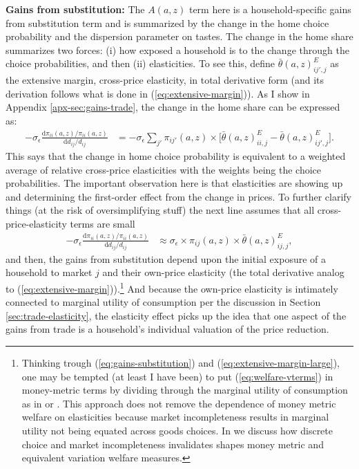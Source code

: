 \documentclass[12pt,pdftex]{article}
\begin{document}
\begin{onehalfspacing}
\textbf{Gains from substitution:} The $A(a,z)$ term here is a household-specific gains from substitution term and is summarized by the change in the home choice probability and the dispersion parameter on tastes. The change in the home share summarizes two forces: (i) how exposed a household is to the change through the choice probabilities, and then (ii) elasticities. To see this, define $\bar{\theta}(a,z) ^E_{ij',j}$ as the extensive margin, cross-price elasticity, in total derivative form (and its derivation follows what is done in (\ref{eq:extensive-margin})). As I show in Appendix \ref{apx-sec:gains-trade}, the change in the home share can be expressed as:
\begin{align}
-\sigma_{\epsilon} \frac{\mathrm{d} \pi_{ii}(a,z) / \pi_{ii}(a,z) }{\mathrm{d} d_{ij} / d_{ij}} &= -\sigma_{\epsilon} \sum_{j'} \pi_{ij'}(a,z) \times \bigg[ \bar{\theta}(a,z) ^E_{ii,j} - \bar{\theta}(a,z) ^E_{ij',j}\bigg]. \label{eq:gains-substitution-cross-price}
\end{align}
This says that the change in home choice probability is equivalent to a weighted average of relative cross-price elasticities with the weights being the choice probabilities. The important observation here is that elasticities are showing up and determining the first-order effect from the change in prices. To further clarify things (at the risk of oversimplifying stuff) the next line assumes that all cross-price-elasticity terms are small
\begin{align}
-\sigma_{\epsilon} \frac{\mathrm{d} \pi_{ii}(a,z) / \pi_{ii}(a,z) }{\mathrm{d} d_{ij} / d_{ij}} & \approx
\sigma_{\epsilon} \times \pi_{ij}(a,z) \times \bar{\theta}(a,z) ^E_{ij,j},
\label{eq:gains-substitution}
\end{align}
and then, the gains from substitution depend upon the initial exposure of a household to market $j$ and their own-price elasticity (the total derivative analog to (\ref{eq:extensive-margin})).\footnote{Thinking trough (\ref{eq:gains-substitution}) and (\ref{eq:extensive-margin-large}), one may be tempted (at least I have been) to put (\ref{eq:welfare-vterms}) in money-metric terms by dividing through the marginal utility of consumption as in \citet{walsh2023inflationary} or \citet{moll2022asset}. This approach does not remove the dependence of money metric welfare on elasticities because market incompleteness results in marginal utility not being equated across goods choices. In \citet{mongey-waugh-2} we discuss how discrete choice and market incompleteness invalidates shapes money metric and equivalent variation welfare measures.} And because the own-price elasticity is intimately connected to marginal utility of consumption per the discussion in Section \ref{sec:trade-elasticity}, the elasticity effect picks up the idea that one aspect of the gains from trade is a household's individual valuation of the price reduction.


\end{onehalfspacing}
\end{document}
